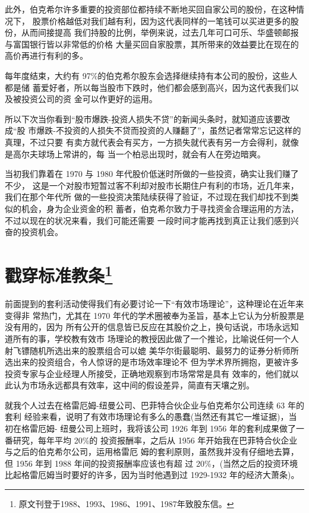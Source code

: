\documentclass[UTF8,a4paper,zihao=-4,fontset = windows]{ctexart} %
\begin{document}
此外，伯克希尔许多重要的投资部位都持续不断地买回自家公司的股份，在这种情况下，
股票价格越低对我们越有利，因为这代表同样的一笔钱可以买进更多的股份，从而间接提高
我们持股的比例，举例来说，过去几年可口可乐、华盛顿邮报与富国银行皆以非常低的价格
大量买回自家股票，其所带来的效益要比在现在的高价再进行有利的多。

每年度结束，大约有 97\%的伯克希尔股东会选择继续持有本公司的股份，这些人都是储
蓄爱好者，所以每当股市下跌时，他们都会感到高兴，因为这代表我们以及被投资公司的资
金可以作更好的运用。

所以下次当你看到“股市爆跌-投资人损失不贷”的新闻头条时，就知道应该要改成“股
市爆跌-不投资的人损失不贷而投资的人赚翻了”，虽然记者常常忘记这样的真理，不过只要
有卖方就代表会有买方，一方损失就代表有另一方会得利，就像是高尔夫球场上常讲的，每
当一个柏忌出现时，就会有人在旁边暗爽。

当初我们靠着在 1970 与 1980 年代股价低迷时所做的一些投资，确实让我们赚了不少，
这是一个对股市短暂过客不利却对股市长期住户有利的市场，近几年来，我们在那个年代所
做的一些投资决策陆续获得了验证，不过现在我们却找不到类似的机会，身为企业资金的积
蓄者，伯克希尔致力于寻找资金合理运用的方法，不过以现在的状况来看，我们可能还需要
一段时间才能再找到真正让我们感到兴奋的投资机会。
\section[戳穿标准教条]{戳穿标准教条\footnote{原文刊登于1988、1993、1986、1991、1987年致股东信。}}

前面提到的套利活动使得我们有必要讨论一下“有效市场理论”，这种理论在近年来变得非
常热门，尤其在 1970 年代的学术圈被奉为圣旨，基本上它认为分析股票是没有用的，因为
所有公开的信息皆已反应在其股价之上，换句话说，市场永远知道所有的事，学校教有效市
场理论的教授因此做了一个推论，比喻说任何一个人射飞镖随机所选出来的股票组合可以媲
美华尔街最聪明、最努力的证券分析师所选出来的投资组合，令人惊讶的是市场效率理论不
但为学术界所拥抱，更被许多投资专家与企业经理人所接受，正确地观察到市场常常是具有
效率的，他们就以此认为市场永远都具有效率，这中间的假设差异，简直有天壤之别。

就我个人过去在格雷厄姆-纽曼公司、巴菲特合伙企业与伯克希尔公司连续 63 年的套利
经验来看，说明了有效市场理论有多么的愚蠢(当然还有其它一堆证据)，当初在格雷厄姆- 纽曼公司上班时，我将该公司 1926 年到 1956 年的套利成果做了一番研究，每年平均 20\%的
投资报酬率，之后从 1956 年开始我在巴菲特合伙企业与之后的伯克希尔公司，运用格雷厄
姆的套利原则，虽然我并没有仔细地去算，但 1956 年到 1988 年间的投资报酬率应该也有超
过 20\%，(当然之后的投资环境比起格雷厄姆当时要好的许多，因为当时他遇到过 1929-1932
年的经济大萧条)。
\end{document}
